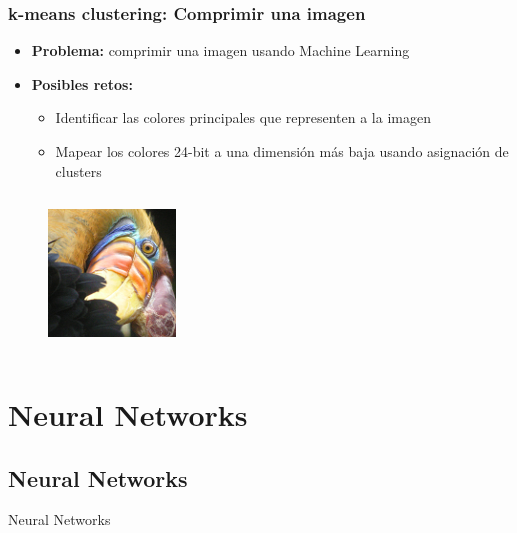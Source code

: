 \documentclass[10pt]{beamer}
\begin{document}
\begin{frame}
\frametitle{k-means clustering: Comprimir una imagen}
\begin{beamerboxesrounded}[upper=uppercolor, lower=lowercolor, shadow=true]{} 

\begin{itemize}
 \item \textbf{Problema:} comprimir una imagen usando Machine Learning
 \item \textbf{Posibles retos:}
   \begin{itemize}
     \item Identificar las colores principales que representen a la imagen
     \item Mapear los colores 24-bit a una dimensi\'on m\'as baja usando asignaci\'on de clusters 
   \end{itemize}
    
\end{itemize}
\end{beamerboxesrounded}

\begin{columns}
\begin{column}{.5\textwidth}
 \begin{figure}
 \includegraphics[scale=0.75]{./Figures/bird_small.png} 
 \end{figure}
\end{column}%

\end{columns}
\end{frame}


\section{Neural Networks}

\subsection{Neural Networks}
\begin{frame}
Neural Networks
\end{frame}
\end{document}
